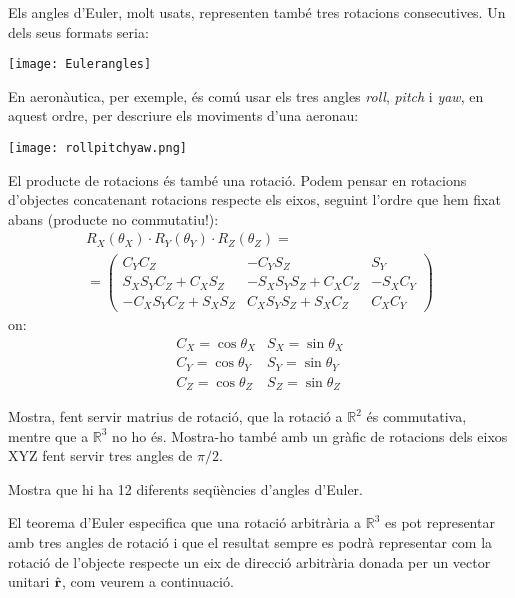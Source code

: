 \documentclass{beamer}
\begin{document}
\begin{frame}[allowframebreaks]
  \framebreak
  
  Els angles d'Euler, molt usats, representen també tres rotacions consecutives. Un dels seus formats seria:
  \begin{center}
    \texttt{[image: Eulerangles]}
  \end{center}

  \framebreak

  En aeronàutica, per exemple, és comú usar els tres angles {\it roll}, {\it pitch} i {\it yaw}, en aquest ordre, per descriure els moviments d'una aeronau:
  \begin{center}
    \texttt{[image: rollpitchyaw.png]}
  \end{center}

\framebreak

  El producte de rotacions és també una rotació. Podem pensar en rotacions d'objectes concatenant rotacions respecte els eixos, seguint l'ordre que hem fixat abans (producte no commutatiu!):
  \[
  \begin{array}{cc}
  R_X(\theta_X) \cdot R_Y(\theta_Y) \cdot R_Z(\theta_Z)=\\
  =\begin{pmatrix}
    C_Y C_Z & -C_Y S_Z & S_Y \\
    S_X S_Y C_Z + C_X S_Z & -S_X S_Y S_Z + C_X C_Z & -S_X C_Y \\
    -C_X S_Y C_Z + S_X S_Z & C_X S_Y S_Z + S_X C_Z & C_X C_Y
    \end{pmatrix}
  \end{array}
  \]
  on:
  \[
    \begin{array}{cc}
      C_X=\cos{\theta_X} & S_X = \sin{\theta_X} \\
      C_Y=\cos{\theta_Y} & S_Y = \sin{\theta_Y} \\
      C_Z=\cos{\theta_Z} & S_Z = \sin{\theta_Z}
    \end{array}
  \]

  \framebreak

  \begin{exercici}{}
    Mostra, fent servir matrius de rotació, que la rotació a $\mathbb{R}^2$ és commutativa, mentre que a $\mathbb{R}^3$ no ho és. Mostra-ho també amb un gràfic de rotacions dels eixos XYZ fent servir tres angles de $\pi/2$.
  \end{exercici}

  \begin{exercici}{}
    Mostra que hi ha 12 diferents seqüències d'angles d'Euler.
  \end{exercici}

  \vspace{\baselineskip}
  El teorema d'Euler especifica que una rotació arbitrària a $\mathbb{R}^3$ es pot representar amb tres angles de rotació i que el resultat sempre es podrà representar com la rotació de l'objecte respecte un  eix de direcció arbitrària donada per un vector unitari $\hat{\textbf{r}}$, com veurem a continuació.
\end{frame}
\end{document}
